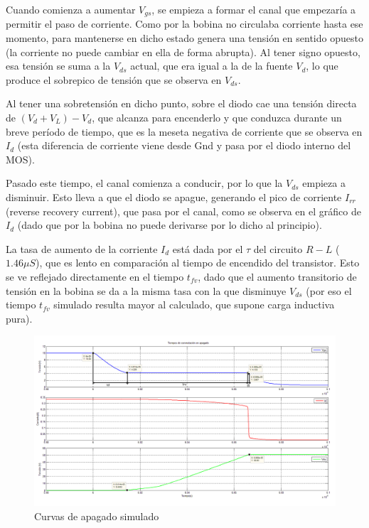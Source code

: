 \documentclass[e4_tp1_main.tex]{subfiles}
\begin{document}
Cuando comienza a aumentar $V_{gs}$, se empieza a formar el canal que empezaría a permitir el paso de corriente. Como por la bobina no circulaba corriente hasta ese momento, para mantenerse en dicho estado genera una tensión en sentido opuesto (la corriente no puede cambiar en ella de forma abrupta). Al tener signo opuesto, esa tensión se suma a la $V_{ds}$ actual, que era igual a la de la fuente $V_d$, lo que produce el sobrepico de tensión que se observa en $V_{ds}$.\par
Al tener una sobretensión en dicho punto, sobre el diodo cae una tensión directa de $(V_{d} + V_L) - V_d$, que alcanza para encenderlo y que conduzca durante un breve período de tiempo, que es la meseta negativa de corriente que se observa en $I_d$ (esta diferencia de corriente viene desde Gnd y pasa por el diodo interno del MOS).\par
Pasado este tiempo, el canal comienza a conducir, por lo que la $V_{ds}$ empieza a disminuir. Esto lleva a que el diodo se apague, generando el pico de corriente $I_{rr}$ (reverse recovery current), que pasa por el canal, como se observa en el gráfico de $I_d$ (dado que por la bobina no puede derivarse por lo dicho al principio).\par
La tasa de aumento de la corriente $I_d$ está dada por el $\tau$ del circuito $R-L$ ($1.46\mu S$), que es lento en comparación al tiempo de encendido del transistor. Esto se ve reflejado directamente en el tiempo $t_{fv}$, dado que el aumento transitorio de tensión en la bobina se da a la misma tasa con la que disminuye $V_{ds}$ (por eso el tiempo $t_{fv}$ simulado resulta mayor al calculado, que supone carga inductiva pura).

\begin{figure}[H]
\centering
\includegraphics[width=1\linewidth]{Imagenes/Punto1/tiempo_apagadoX.png}
\caption{Curvas de apagado simulado}
\end{figure}
\end{document}
